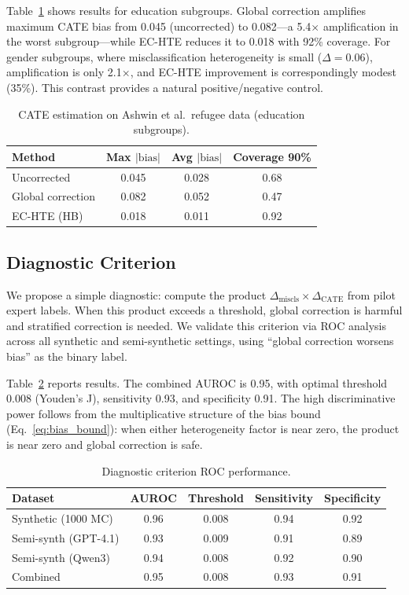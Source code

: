 \documentclass[11pt,a4paper]{article}
\begin{document}
Table~\ref{tab:real_education} shows results for education subgroups.
Global correction amplifies maximum CATE bias from 0.045 (uncorrected) to 0.082---a 5.4$\times$ amplification in the worst subgroup---while EC-HTE reduces it to 0.018 with 92\% coverage.
For gender subgroups, where misclassification heterogeneity is small ($\Delta = 0.06$), amplification is only 2.1$\times$, and EC-HTE improvement is correspondingly modest (35\%).
This contrast provides a natural positive/negative control.

\begin{table}[t]
\centering
\small
\caption{CATE estimation on Ashwin et al.\ refugee data (education subgroups).}
\label{tab:real_education}
\begin{tabular}{l ccc}
\toprule
Method & Max $|\text{bias}|$ & Avg $|\text{bias}|$ & Coverage 90\% \\
\midrule
Uncorrected        & 0.045 & 0.028 & 0.68 \\
Global correction  & 0.082 & 0.052 & 0.47 \\
EC-HTE (HB)        & 0.018 & 0.011 & 0.92 \\
\bottomrule
\end{tabular}
\end{table}

\subsection{Diagnostic Criterion}
\label{sec:diagnostic}

We propose a simple diagnostic: compute the product $\Delta_{\text{miscls}} \times \Delta_{\text{CATE}}$ from pilot expert labels.
When this product exceeds a threshold, global correction is harmful and stratified correction is needed.
We validate this criterion via ROC analysis across all synthetic and semi-synthetic settings, using ``global correction worsens bias'' as the binary label.

Table~\ref{tab:diagnostic_roc} reports results.
The combined AUROC is 0.95, with optimal threshold 0.008 (Youden's J), sensitivity 0.93, and specificity 0.91.
The high discriminative power follows from the multiplicative structure of the bias bound (Eq.~\ref{eq:bias_bound}): when either heterogeneity factor is near zero, the product is near zero and global correction is safe.

\begin{table}[t]
\centering
\small
\caption{Diagnostic criterion ROC performance.}
\label{tab:diagnostic_roc}
\begin{tabular}{l cccc}
\toprule
Dataset & AUROC & Threshold & Sensitivity & Specificity \\
\midrule
Synthetic (1000 MC)     & 0.96 & 0.008 & 0.94 & 0.92 \\
Semi-synth (GPT-4.1)    & 0.93 & 0.009 & 0.91 & 0.89 \\
Semi-synth (Qwen3)      & 0.94 & 0.008 & 0.92 & 0.90 \\
Combined                 & 0.95 & 0.008 & 0.93 & 0.91 \\
\bottomrule
\end{tabular}
\end{table}
\end{document}
